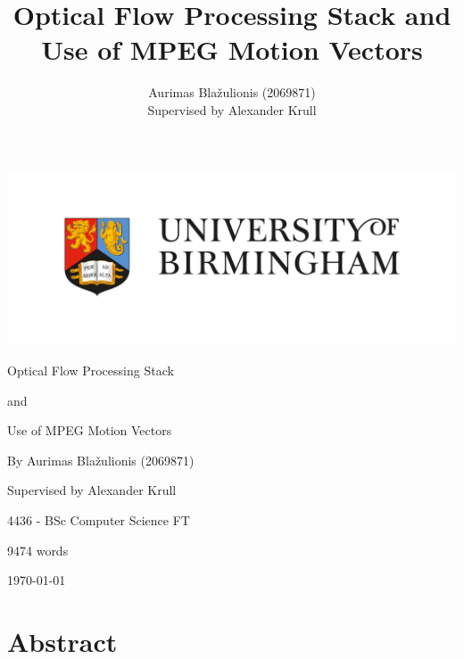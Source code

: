 \documentclass[11pt,english]{report}
\author{
	Aurimas Blažulionis (2069871)\\
	Supervised by Alexander Krull
}
\title{Optical Flow Processing Stack and Use of MPEG Motion Vectors}
\begin{document}
\thispagestyle{empty}

\vspace*{1cm}

\begin{centering}

\includegraphics[width=500pt]{docs/report/uob.jpg}

\Huge{Optical Flow Processing Stack}

\huge{and}

\huge{Use of MPEG Motion Vectors}

\end{centering}

\vfill

{

\Large{By Aurimas Blažulionis (2069871)}

\Large{Supervised by Alexander Krull}

\Large{4436 - BSc Computer Science FT}

\Large{9474 words}

\Large{\today}

}

\vspace*{0.2cm}

\clearpage

\section*{Abstract}
\end{document}
